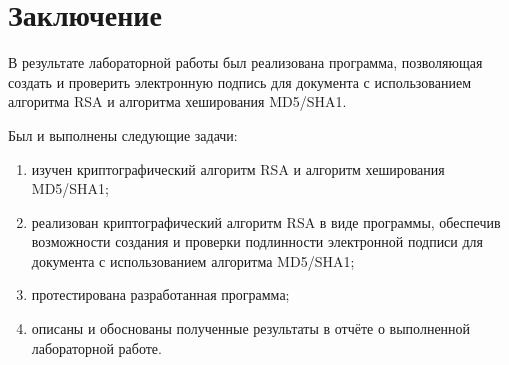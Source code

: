 \chapter*{Заключение}

В результате лабораторной работы был реализована программа, позволяющая создать и проверить электронную подпись для документа с использованием алгоритма RSA и алгоритма хеширования MD5/SHA1.

Был и выполнены следующие задачи:
\begin{enumerate}[label=\arabic*)]
	\item изучен криптографический алгоритм RSA и алгоритм хеширования MD5/SHA1;
	\item реализован криптографический алгоритм RSA в виде программы, обеспечив возможности создания и проверки подлинности электронной подписи для документа с использованием алгоритма MD5/SHA1;
	\item протестирована разработанная программа;
	\item описаны и обоснованы полученные результаты в отчёте о выполненной лабораторной работе.
\end{enumerate}